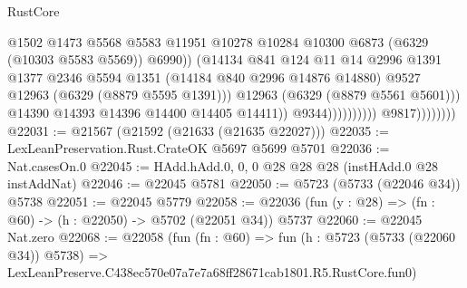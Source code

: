\begin{lexlean}{RustCore}
\begin{coremodule}
                                                  @1502
                                                  @1473
                                                  @5568
                                                  @5583
                                                  @11951
                                                  @10278
                                                  @10284
                                                  @10300
                                                  @6873
                                                  (@6329 (@10303 @5583 @5569))
                                                  @6990))
                                              (@14134
                                                @841
                                                @124
                                                @11
                                                @14
                                                @2996
                                                @1391
                                                @1377
                                                @2346
                                                @5594
                                                @1351
                                                (@14184 @840 @2996 @14876 @14880)
                                                @9527
                                                @12963
                                                (@6329 (@8879 @5595 @1391)))
                                              @12963
                                              (@6329 (@8879 @5561 @5601)))
                                            @14390
                                            @14393
                                            @14396
                                            @14400
                                            @14405
                                            @14411))
                                        @9344))))))))))
                    @9817))))))))
@22031 := @21567 (@21592 (@21633 (@21635 @22027)))
@22035 := LexLeanPreservation.Rust.CrateOK @5697 @5699 @5701
@22036 := Nat.casesOn.{0}
@22045 := HAdd.hAdd.{0, 0, 0} @28 @28 @28 (instHAdd.{0} @28 instAddNat)
@22046 := @22045 @5781
@22050 := @5723 (@5733 (@22046 @34)) @5738
@22051 := @22045 @5779
@22058 := @22036 (fun (y : @28) => (fn : @60) -> (h : @22050) -> @5702 (@22051 @34)) @5737
@22060 := @22045 Nat.zero
@22068 := @22058
    (fun (fn : @60) =>
    fun (h : @5723 (@5733 (@22060 @34)) @5738) =>
    LexLeanPreserve.C438ec570e07a7e7a68ff28671cab1801.R5.RustCore.fun0)

\end{coremodule}
\end{lexlean}
